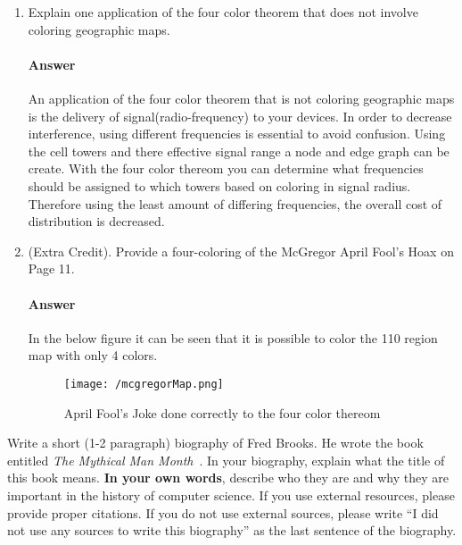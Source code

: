 \documentclass{article}
\begin{document}
\begin{enumerate}
    \item Explain one application of the four color theorem that does not
        involve coloring geographic maps.

        \paragraph{Answer}
        An application of the four color theorem that is not coloring geographic maps is the delivery of signal(radio-frequency) to your devices.
        In order to decrease interference, using different frequencies is essential to avoid confusion.
        Using the cell towers and there effective signal range a node and edge graph can be create.
        With the four color thereom you can determine what frequencies should be assigned to which towers based on coloring in signal radius.
        Therefore using the least amount of differing frequencies, the overall cost of distribution is decreased.

    \item (Extra Credit). Provide a four-coloring of the McGregor April Fool's
        Hoax on Page 11.

        \paragraph{Answer}
        In the below figure it can be seen that it is possible to color the 110 region map with only 4 colors.
        \begin{figure}
          \texttt{[image: /mcgregorMap.png]}
          \caption{April Fool's Joke done correctly to the four color thereom}
          \label{fig:McGregorMap}
        \end{figure}

\end{enumerate}


Write a short (1-2 paragraph) biography of Fred Brooks.  He wrote the book
entitled \emph{The Mythical Man Month}~\cite{brooks-manmonth}.  In your
biography, explain what the title of this book means.
\textbf{In your own words}, describe who they are and why they are important in
the history of computer science.  If you use external resources, please provide
proper citations. If you do not use external sources, please write ``I did not
use any sources to write this biography'' as the last sentence of the
biography.
\end{document}
